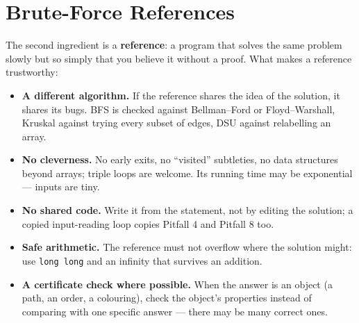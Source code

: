 \clneed
\section{Brute-Force References}
\label{sec:ts-brute}

The second ingredient is a \textbf{reference}: a program that solves the same problem slowly but so simply that you believe it without a proof. What makes a reference trustworthy:
\begin{itemize}[leftmargin=*]
    \item \textbf{A different algorithm.} If the reference shares the idea of the solution, it shares its bugs. BFS is checked against Bellman--Ford or Floyd--Warshall, Kruskal against trying every subset of edges, DSU against relabelling an array.
    \item \textbf{No cleverness.} No early exits, no ``visited'' subtleties, no data structures beyond arrays; triple loops are welcome. Its running time may be exponential --- inputs are tiny.
    \item \textbf{No shared code.} Write it from the statement, not by editing the solution; a copied input-reading loop copies Pitfall 4 and Pitfall 8 too.
    \item \textbf{Safe arithmetic.} The reference must not overflow where the solution might: use \texttt{long long} and an infinity that survives an addition.
    \item \textbf{A certificate check where possible.} When the answer is an object (a path, an order, a colouring), check the object's properties instead of comparing with one specific answer --- there may be many correct ones.
\end{itemize}

